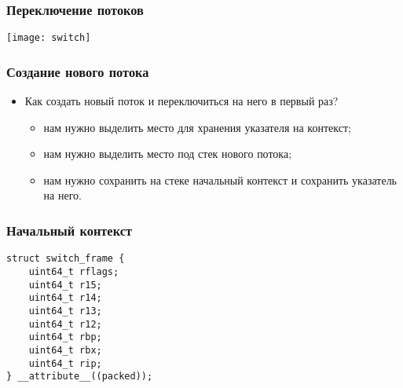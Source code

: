 \begin{frame}
\frametitle{Переключение потоков}
\texttt{[image: switch]}
\end{frame}

\begin{frame}
\frametitle{Создание нового потока}
\begin{itemize}
    \item Как создать новый поток и переключиться на него в первый раз?
    \begin{itemize}
        \item<1->нам нужно выделить место для хранения указателя на контекст;
        \item<2->нам нужно выделить место под стек нового потока;
        \item<3->нам нужно сохранить на стеке начальный контекст и сохранить
        указатель на него.
    \end{itemize}
\end{itemize}
\end{frame}

\begin{frame}[fragile]
\frametitle{Начальный контекст}
\begin{lstlisting}
struct switch_frame {
    uint64_t rflags;
    uint64_t r15;
    uint64_t r14;
    uint64_t r13;
    uint64_t r12;
    uint64_t rbp;
    uint64_t rbx;
    uint64_t rip;
} __attribute__((packed));
\end{lstlisting}
\end{frame}
